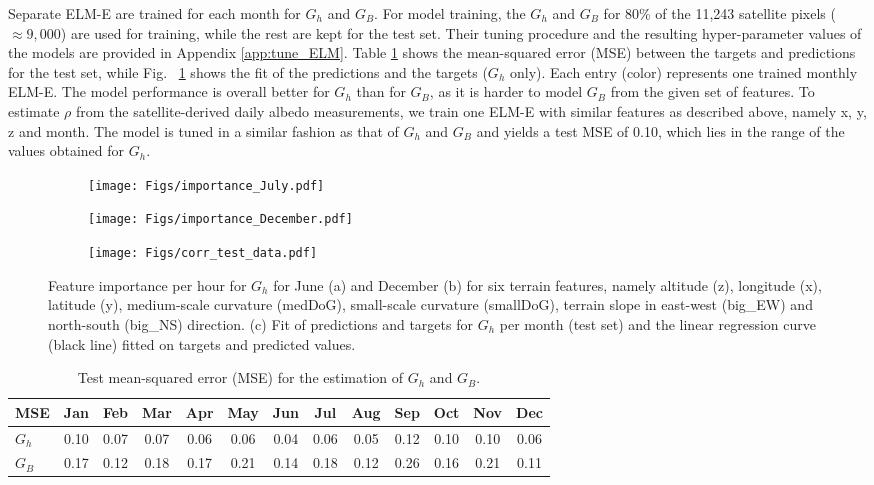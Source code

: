 Separate ELM-E are trained for each month for $G_h$ and $G_B$. For model training, the $G_h$ and $G_B$ for 80\% of the 11,243 satellite pixels ($\approx 9,000$) are used for training, while the rest are kept for the test set. Their tuning procedure and the resulting hyper-parameter values of the models are provided in Appendix \ref{app:tune_ELM}. 
Table \ref{tab:G_train} shows the mean-squared error (MSE) between the targets and predictions for the test set, while Fig.~ \ref{figc:ELM_training} shows the fit of the predictions and the targets ($G_h$ only). Each entry (color) represents one trained monthly ELM-E.
The model performance is overall better for $G_h$ than for $G_B$, as it is harder to model $G_B$ from the given set of features.
%
To estimate $\rho$ from the satellite-derived daily albedo measurements, we train one ELM-E with similar features as described above, namely x, y, z and month. The model is tuned in a similar fashion as that of $G_h$ and $G_B$ and yields a test MSE of 0.10, which lies in the range of the values obtained for $G_h$.

\begin{figure}[tb]
\centering
\begin{subfigure}{.32\textwidth}
  \centering
  \texttt{[image: Figs/importance\_July.pdf]}  
\end{subfigure}
\begin{subfigure}{.32\textwidth}
  \centering
  \texttt{[image: Figs/importance\_December.pdf]}  
\end{subfigure}
\begin{subfigure}{.32\textwidth}
  \centering
  \texttt{[image: Figs/corr\_test\_data.pdf]}  
  \caption{}
  \label{figc:ELM_training}
\end{subfigure}
\caption{Feature importance per hour for $G_h$ for June (a) and December (b) for six terrain features, namely altitude (z), longitude (x), latitude (y), medium-scale curvature (medDoG), small-scale curvature (smallDoG), terrain slope in east-west (big\_EW) and north-south (big\_NS) direction. (c) Fit of predictions and targets for $G_h$ per month (test set) and the linear regression curve (black line) fitted on targets and predicted values.}
\label{fig:ftrs_phys}
\end{figure}

\begin{table}[tb]
\centering
\footnotesize
\caption{Test mean-squared error (MSE) for the estimation of $G_h$ and $G_B$.}
\label{tab:G_train}
\begin{tabular}{lcccccccccccc}
\hline 
 \textbf{MSE}   & Jan  & Feb  & Mar   & Apr   & May   & Jun   & Jul   & Aug   & Sep   & Oct  & Nov  & Dec  \\
\hline 
$G_h$  & 0.10 & 0.07 & 0.07  & 0.06  & 0.06  & 0.04  & 0.06  & 0.05  & 0.12  & 0.10 & 0.10 & 0.06 \\
$G_B$  & 0.17 & 0.12 & 0.18 & 0.17 & 0.21 & 0.14  & 0.18  & 0.12 & 0.26 & 0.16 & 0.21 & 0.11 \\
\hline 
\end{tabular}
\end{table}

